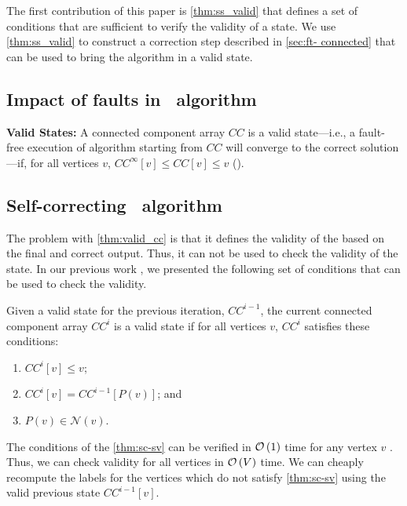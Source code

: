 The first contribution of this paper is \cref{thm:ss_valid} that defines a set
of conditions that are sufficient to verify the validity of a state. We use
\cref{thm:ss_valid} to construct a correction step described in \cref{sec:ft-
connected} that can be used to bring the algorithm in a valid state.




\subsection{Impact of faults in \sv~algorithm}

\begin{thm}{ \textbf{Valid States:}}
\label{thm:valid_cc}
A connected component array $CC$ is a valid state---i.e., a fault-free
execution of algorithm starting from $CC$ will converge to
the correct solution---if, for all vertices $v$, $CC^{\infty}[v]\leq CC[v]\leq v$ (\cite{sao2016sccc}).
\end{thm}



\subsection{Self-correcting \sv~algorithm}

The problem with \cref{thm:valid_cc} is that it defines the validity of the
based on the final and correct output. Thus, it can not be used to check the
validity of the state.  In our previous work \cite{sao2016sccc}, we presented
the following set of conditions that can be used to check the validity.

\begin{thm}
\label{thm:sc-sv}
Given a valid state for the previous iteration, $CC^{i-1}$, the current connected component array $CC^{i}$ is a valid state if for all vertices $v$, $CC^{i}$ satisfies these conditions:
\begin{enumerate}
\item $CC^{i}[v] \leq v$; 
\item $CC^{i}[v] = CC^{i-1}[P(v)]$; and
\item $P(v) \in \mathcal{N}(v)$. %
\end{enumerate}
\end{thm}


The conditions of  the \cref{thm:sc-sv} can be verified in $\mathcal{O} \left ( 1 \right )$ time for
any vertex $v$ \cite{sao2016sccc}. Thus,   we can check validity for all
vertices in  $\mathcal{O} \left ( V \right )$ time. We can cheaply recompute the labels for the
vertices  which do not satisfy \cref{thm:sc-sv} using the valid previous state
$CC^{i-1}[v]$.

